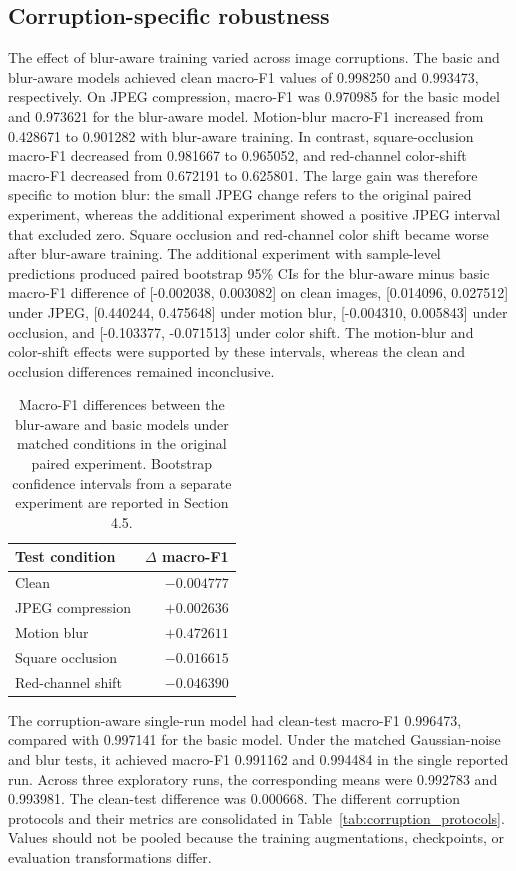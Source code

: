 \documentclass{sbc2023}%
\begin{document}
\subsection{Corruption-specific robustness}
The effect of blur-aware training varied across image corruptions. The basic and blur-aware models achieved clean macro-F1 values of 0.998250 and 0.993473, respectively. On JPEG compression, macro-F1 was 0.970985 for the basic model and 0.973621 for the blur-aware model. Motion-blur macro-F1 increased from 0.428671 to 0.901282 with blur-aware training. In contrast, square-occlusion macro-F1 decreased from 0.981667 to 0.965052, and red-channel color-shift macro-F1 decreased from 0.672191 to 0.625801. The large gain was therefore specific to motion blur: the small JPEG change refers to the original paired experiment, whereas the additional experiment showed a positive JPEG interval that excluded zero. Square occlusion and red-channel color shift became worse after blur-aware training. The additional experiment with sample-level predictions produced paired bootstrap 95\% CIs for the blur-aware minus basic macro-F1 difference of [-0.002038, 0.003082] on clean images, [0.014096, 0.027512] under JPEG, [0.440244, 0.475648] under motion blur, [-0.004310, 0.005843] under occlusion, and [-0.103377, -0.071513] under color shift. The motion-blur and color-shift effects were supported by these intervals, whereas the clean and occlusion differences remained inconclusive.

\begin{table}[!tbp]
  \centering
  \caption{Macro-F1 differences between the blur-aware and basic models under matched conditions in the original paired experiment. Bootstrap confidence intervals from a separate experiment are reported in Section 4.5.}
  \label{tab:paired_effects}
  \small
  \begin{tabular}{lr}
  \toprule
  Test condition & $\Delta$ macro-F1 \\
  \midrule
  Clean & $-0.004777$ \\
  JPEG compression & $+0.002636$ \\
  Motion blur & $+0.472611$ \\
  Square occlusion & $-0.016615$ \\
  Red-channel shift & $-0.046390$ \\
  \bottomrule
  \end{tabular}
\end{table}

The corruption-aware single-run model had clean-test macro-F1 0.996473, compared with 0.997141 for the basic model. Under the matched Gaussian-noise and blur tests, it achieved macro-F1 0.991162 and 0.994484 in the single reported run. Across three exploratory runs, the corresponding means were 0.992783 and 0.993981. The clean-test difference was 0.000668. The different corruption protocols and their metrics are consolidated in Table~\ref{tab:corruption_protocols}. Values should not be pooled because the training augmentations, checkpoints, or evaluation transformations differ.
\end{document}
